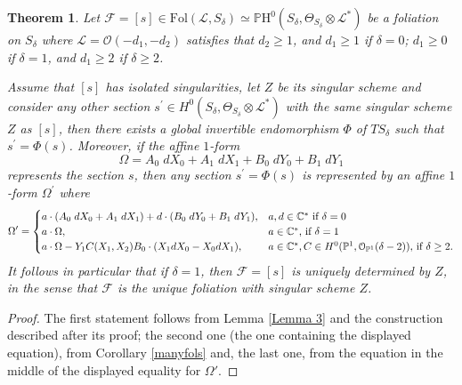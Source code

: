 \documentclass{amsart} %
\newtheorem{theorem}{Theorem}[section]
\theoremstyle{definition}
\newcommand{\cs}{S_{\delta}}
\newcommand{\PP}{\mathbb{P}}
\newcommand{\CC}{\mathbb{C}}
\newcommand{\mcL}{\mathcal{L}}
\newcommand{\mcO}{\mathcal{O}}
\newcommand{\mcK}{\mathcal{K}}
\newcommand{\mcE}{\mathcal{E}}
\newcommand{\mcF}{\mathcal{F}}
\begin{document}
 \begin{theorem}\label{mainT}
 Let $ \mcF = [s] \in \mathrm{Fol}(\mcL,S_{\delta}) \simeq \PP\text{H}^0(\cs, \Theta_{S_{\delta}}\otimes \mcL^*) $
 be a foliation on $ \cs $
 where $ \mcL = \mcO( -d_1, -d_2 ) $ satisfies that
 $ d_2 \geq 1 $, and
 $ d_1 \geq 1 $ if $ \delta = 0 $;
 $ d_1 \geq 0 $ if $ \delta = 1 $, and
 $ d_1 \geq 2 $ if $ \delta \geq 2 $.

 Assume that $ [s] $ has isolated singularities, let $ Z $ be its singular scheme and consider any other
 section $ s^{\prime} \in H^0(\cs, \Theta_{S_{\delta}}\otimes \mcL^*)$ with the same singular
 scheme  $ Z $ as $ [s] $, then there exists a global invertible endomorphism $ \Phi $ of $TS_{\delta} $
 such that $ s^{\prime} = \Phi( s ) $. Moreover, if the affine $1$-form
 $$ \Omega = A_0\;dX_0+A_1\; dX_1+B_0\; dY_0+ B_1\;dY_1 $$ represents the section $ s $, then any
 section $ s^{\prime} = \Phi( s ) $ is represented by an affine $1$-form $ \Omega^{\prime} $ where
 \begin{equation*}\label{thm2}
   \Omega^{\prime} =
    \begin{cases}
     a\cdot(A_0\;dX_0+A_1\; dX_1) + d\cdot(B_0\; dY_0+ B_1\;dY_1), & \mbox{$ a, d\in \CC^* $ if $\delta=0$ }  \\
      a\cdot\Omega, & \mbox{$ a\in\CC^* $, if $\delta = 1 $ } \\
     a\cdot\Omega - Y_1 C(X_1,X_2) B_0 \cdot (X_1 dX_0 - X_0 dX_1) ,
      & \mbox{$ a\in\CC^*, C \in H^0(\PP^1, \mcO_{\PP^1}( \delta -2 )) $, if $\delta\geq 2$.}
    \end{cases}
 \end{equation*}
 It follows in particular that if $ \delta = 1 $, then $ \mcF = [s] $ is uniquely determined by $ Z $, in the
 sense that $ \mcF $ is the unique foliation with singular scheme $ Z $.
 \end{theorem}
\begin{proof}
  The first statement follows  from Lemma \ref{Lemma 3} and the construction described after its proof;
  the second one (the one containing the displayed equation),  from Corollary \ref{manyfols} and,
  the last one, from the equation in the middle of the displayed equality for $\Omega'$.
\end{proof}
\end{document}
